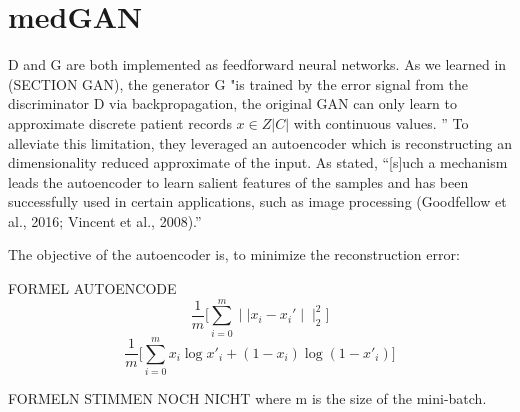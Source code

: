 \documentclass[11pt, a4paper]{book}
\begin{document}
\section{medGAN}
D and G are both implemented as feedforward neural networks.
As we learned in (SECTION GAN), the generator G "is trained by the error signal from the discriminator D via backpropagation, the original GAN can only learn to approximate discrete patient records $x \in Z|C|$ with continuous values. ” \cite{Choi2017}
To alleviate this limitation, they leveraged an autoencoder which is reconstructing an dimensionality reduced approximate of the input. As \cite{Choi2017} stated, “[s]uch a mechanism leads the autoencoder to learn salient features of the samples and has been successfully used in certain applications, such as image processing (Goodfellow et al., 2016; Vincent et al., 2008).” 

The objective of the autoencoder is, to minimize the reconstruction error:

FORMEL AUTOENCODE
\begin{equation}
\frac{1}{m}\big[\sum_{i=0}^m \mid\mid x_i - x_i'\mid\mid_2^2]
\end{equation}
\begin{equation}
\frac{1}{m}\big[\sum_{i=0}^m x_i \log x'_i + (1-x_i) \log (1-x'_i)]
\end{equation}

FORMELN STIMMEN NOCH NICHT
where m is the size of the mini-batch.
\end{document}
